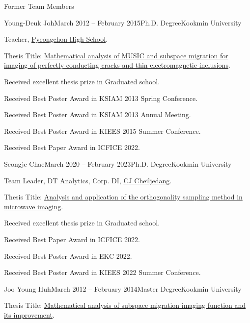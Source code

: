 \documentclass{resume} %
\begin{document}
\begin{rSection}{Former Team Members}

\begin{rSubsection}{Young-Deuk Joh}{March 2012 -- February 2015}{Ph.D. Degree}{Kookmin University}
\item Teacher, \href{https://pyeongchon.hs.kr}{Pyeongchon High School}.
\item Thesis Title: \href{http://www.riss.kr/link?id=T13683375}{Mathematical analysis of MUSIC and subspace migration for imaging of perfectly conducting cracks and thin electromagnetic inclusions}.
\item Received excellent thesis prize in Graduated school.
\item Received Best Poster Award in KSIAM 2013 Spring Conference.
\item Received Best Poster Award in KSIAM 2013 Annual Meeting.
\item Received Best Poster Award in KIEES 2015 Summer Conference.
\item Received Best Paper Award in ICFICE 2022.
\end{rSubsection}

\begin{rSubsection}{Seongje Chae}{March 2020 -- February 2023}{Ph.D. Degree}{Kookmin University}
\item Team Leader, DT Analytics, Corp. DI, \href{https://www.cj.co.kr/kr/index}{CJ Cheiljedang}.
\item Thesis Title: \href{http://www.riss.kr/link?id=T16631991}{Analysis and application of the orthogonality sampling method in microwave imaging}.
\item Received excellent thesis prize in Graduated school.
\item Received Best Paper Award in ICFICE 2022.
\item Received Best Poster Award in EKC 2022.
\item Received Best Poster Award in KIEES 2022 Summer Conference.
\end{rSubsection}

\begin{rSubsection}{Joo Young Huh}{March 2012 -- February 2014}{Master Degree}{Kookmin University}
\item Thesis Title: \href{http://www.riss.kr/link?id=T13428018}{Mathematical analysis of subspace migration imaging function and its improvement}.
\end{rSubsection}


\end{rSection}
\end{document}
